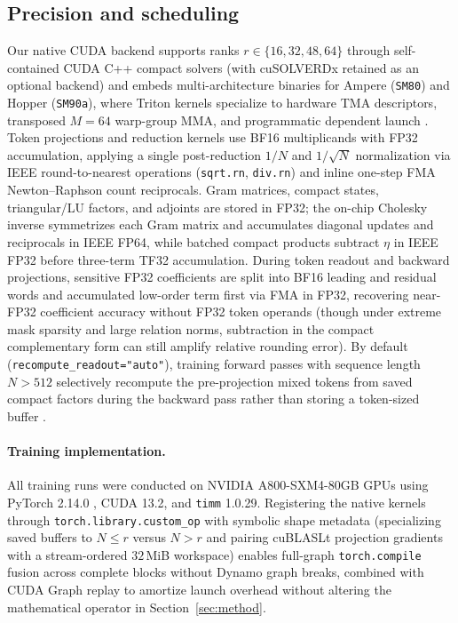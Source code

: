 \documentclass[10pt,twocolumn]{article}
\begin{document}
\subsection{Precision and scheduling}
\label{app:precision}
Our native CUDA backend supports ranks $r\in\{16,32,48,64\}$ through
self-contained CUDA C++ compact solvers (with cuSOLVERDx retained as an
optional backend) and embeds multi-architecture binaries for Ampere
(\texttt{SM80}) and Hopper (\texttt{SM90a}), where Triton kernels specialize
to hardware TMA descriptors, transposed $M=64$ warp-group MMA, and
programmatic dependent launch \cite{shah2024flashattention3}.
Token projections and reduction kernels use BF16 multiplicands with FP32
accumulation, applying a single post-reduction $1/N$ and $1/\sqrt{N}$
normalization via IEEE round-to-nearest operations (\texttt{sqrt.rn},
\texttt{div.rn}) and inline one-step FMA Newton--Raphson count reciprocals.
Gram matrices, compact states, triangular/LU factors, and adjoints are stored
in FP32; the on-chip Cholesky inverse symmetrizes each Gram matrix and
accumulates diagonal updates and reciprocals in IEEE FP64, while batched
compact products subtract $\eta$ in IEEE FP32 before three-term TF32
accumulation.
During token readout and backward projections, sensitive FP32 coefficients are
split into BF16 leading and residual words and accumulated low-order term
first via FMA in FP32, recovering near-FP32 coefficient accuracy without FP32
token operands (though under extreme mask sparsity and large relation norms,
subtraction in the compact complementary form can still amplify relative
rounding error).
By default (\texttt{recompute\_readout="auto"}), training forward passes with
sequence length $N>512$ selectively recompute the pre-projection mixed tokens
from saved compact factors during the backward pass rather than storing a
token-sized buffer \cite{korthikanti2023reducing}.

\paragraph{Training implementation.}
All training runs were conducted on NVIDIA A800-SXM4-80GB GPUs using PyTorch
2.14.0 \cite{ansel2024pytorch2}, CUDA 13.2, and \texttt{timm} 1.0.29.
Registering the native kernels through \texttt{torch.library.custom\_op} with
symbolic shape metadata (specializing saved buffers to $N\le r$ versus $N>r$
and pairing cuBLASLt projection gradients with a stream-ordered $32$\,MiB
workspace) enables full-graph \texttt{torch.compile} fusion
\cite{ansel2024pytorch2} across complete blocks without Dynamo graph breaks,
combined with CUDA Graph replay to amortize launch overhead without altering
the mathematical operator in Section~\ref{sec:method}.
\end{document}
